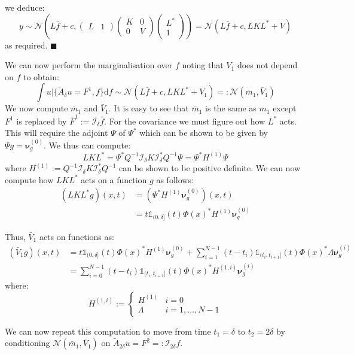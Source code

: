 \documentclass{article}
\renewcommand\qedsymbol{$\blacksquare$}
\theoremstyle{definition}
\theoremstyle{remark}
\theoremstyle{remark}
\begin{document}
we deduce:
\begin{equation*}
    y\sim\mathcal{N}\left(L\bar{f}+c, \begin{pmatrix}
        L & 1
    \end{pmatrix}\begin{pmatrix}
                    K & 0 \\
                    0 & V
                \end{pmatrix}\begin{pmatrix}
                    L^{*} \\
                    1
                \end{pmatrix}\right)=\mathcal{N}(L\bar{f}+c,LKL^{*}+V)
\end{equation*}
as required. \qedsymbol

\noindent We can now perform the marginalisation over $f$ noting that $V_1$ does not depend on $f$ to obtain:
\begin{equation}
    \int u|\{\tilde{A}_{\delta}u=F^{1},f\}\mathrm{d}f\sim\mathcal{N}(L\bar{f}+c,LKL^{*}+V_{1})=:\mathcal{N}(\bar{m}_{1},\bar{V}_{1})
\end{equation}
We now compute $\bar{m}_1$ and $\bar{V}_1$. It is easy to see that $\bar{m}_{1}$ is the same as $m_1$ except $F^1$ is replaced by $\bar{F}^1:=\mathcal{I}_{\delta}\bar{f}$. For the covariance we must figure out how $L^{*}$ acts. This will require the adjoint $\Psi$ of $\Psi^{*}$ which can be shown to be given by $\Psi g=\boldsymbol{\nu}_{g}^{(0)}$. We thus can compute:
\begin{equation}
    LKL^{*} = \Psi^{*}Q^{-1}\mathcal{I}_{\delta}K\mathcal{I}_{\delta}^{*}Q^{-1}\Psi = \Psi^{*}H^{(1)}\Psi
\end{equation}
where $H^{(1)}:=Q^{-1}\mathcal{I}_{\delta}K\mathcal{I}_{\delta}^{*}Q^{-1}$ can be shown to be positive definite. We can now compute how $LKL^{*}$ acts on a function $g$ as follows:
\begin{align*}
    (LKL^{*}g)(x,t) &= (\Psi^{*}H^{(1)}\boldsymbol{\nu}_{g}^{(0)})(x,t) \\ &=t\mathbb{1}_{(0,\delta]}(t)\Phi(x)^{*}H^{(1)}\boldsymbol{\nu}_{g}^{(0)}
\end{align*}

\noindent Thus, $\bar{V}_{1}$ acts on functions as:
\begin{align*}
    (\bar{V}_{1}g)(x,t) &= t\mathbb{1}_{(0,\delta]}(t)\Phi(x)^{*}H^{(1)}\boldsymbol{\nu}_{g}^{(0)} +\sum_{i=1}^{N-1}(t-t_{i})\mathbb{1}_{(t_{i},t_{i+1}]}(t)\Phi(x)^{*}\Lambda\boldsymbol{\nu}_{g}^{(i)} \\
    &=\sum_{i=0}^{N-1}(t-t_{i})\mathbb{1}_{(t_{i},t_{i+1}]}(t)\Phi(x)^{*}H^{(1,i)}\boldsymbol{\nu}_{g}^{(i)}
\end{align*}
where:
\begin{equation*}
    H^{(1,i)}:=\left\{
\begin{array}{ll}
      H^{(1)} & i=0 \\
      \Lambda & i=1,\dots,N-1
\end{array}
\right.
\end{equation*}

\noindent We can now repeat this computation to move from time $t_1=\delta$ to $t_2=2\delta$ by conditioning $\mathcal{N}(\bar{m}_1,\bar{V}_1)$ on $\tilde{A}_{2\delta}u=F^2=:\mathcal{I}_{2\delta}f$.
\end{document}
